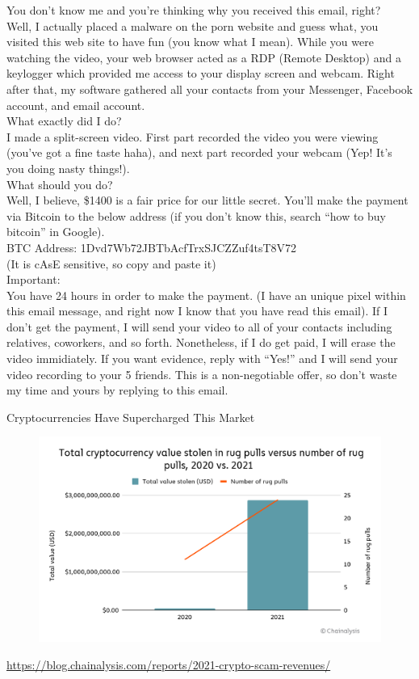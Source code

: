 \documentclass[nobackground,dvipsnames,table,aspectratio=169]{beamer}
\begin{document}
\begin{frame}{}%
    \thispagestyle{empty}
    \footnotesize
    You don’t know me and you’re thinking why you received this email, right?\\
    Well, I actually placed a malware on the porn website and guess what, you visited this web site to have fun (you know what I mean). While you were watching the video, your web browser acted as a RDP (Remote Desktop) and a keylogger which provided me access to your display screen and webcam. Right after that, my software gathered all your contacts from your Messenger, Facebook account, and email account.\\
    What exactly did I do?\\
    I made a split-screen video. First part recorded the video you were viewing (you’ve got a fine taste haha), and next part recorded your webcam (Yep! It’s you doing nasty things!).\\
    What should you do?\\
    Well, I believe, \$1400 is a fair price for our little secret. You’ll make the payment via Bitcoin to the below address (if you don’t know this, search “how to buy bitcoin” in Google).\\
    BTC Address: 1Dvd7Wb72JBTbAcfTrxSJCZZuf4tsT8V72\\
    (It is cAsE sensitive, so copy and paste it)\\
    Important:\\
    You have 24 hours in order to make the payment. (I have an unique pixel within this email message, and right now I know that you have read this email). If I don’t get the payment, I will send your video to all of your contacts including relatives, coworkers, and so forth. Nonetheless, if I do get paid, I will erase the video immidiately. If you want evidence, reply with “Yes!” and I will send your video recording to your 5 friends. This is a non-negotiable offer, so don’t waste my time and yours by replying to this email.
\end{frame}

\begin{frame}{Cryptocurrencies Have Supercharged This Market}
    \begin{figure}
        \centering
        \includegraphics[width=\textwidth]{rug-pulls}
    \end{figure}
    \url{https://blog.chainalysis.com/reports/2021-crypto-scam-revenues/}
\end{frame}
\end{document}
